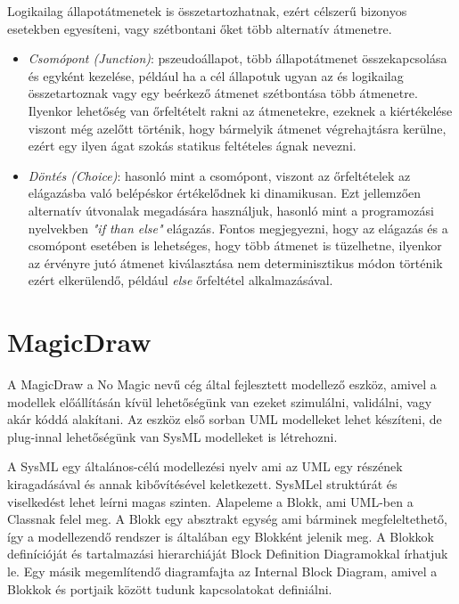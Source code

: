 \linebreak Logikailag állapotátmenetek is összetartozhatnak, ezért célszerű bizonyos esetekben egyesíteni, vagy szétbontani őket több alternatív átmenetre.
\begin{itemize}
	\item \emph{Csomópont (Junction)}: pszeudoállapot, több állapotátmenet összekapcsolása és egyként kezelése, például ha a cél állapotuk ugyan az és logikailag összetartoznak vagy egy beérkező átmenet szétbontása több átmenetre. Ilyenkor lehetőség van őrfeltételt rakni az átmenetekre, ezeknek a kiértékelése viszont még azelőtt történik, hogy bármelyik átmenet végrehajtásra kerülne, ezért egy ilyen ágat szokás statikus feltételes ágnak nevezni.
	\item \emph{Döntés (Choice)}: hasonló mint a csomópont, viszont az őrfeltételek az elágazásba való belépéskor értékelődnek ki dinamikusan. Ezt jellemzően alternatív útvonalak megadására használjuk, hasonló mint a programozási nyelvekben \emph{"if than else"} elágazás. Fontos megjegyezni, hogy az elágazás és a csomópont esetében is lehetséges, hogy több átmenet is tüzelhetne, ilyenkor az érvényre jutó átmenet kiválasztása nem determinisztikus módon történik ezért elkerülendő, például \emph{else} őrfeltétel alkalmazásával.
	
	
	
	
\end{itemize}

\section{MagicDraw}
A MagicDraw a No Magic \cite{NoMag} nevű cég által fejlesztett modellező eszköz, amivel a modellek előállításán kívül lehetőségünk van ezeket szimulálni, validálni, vagy akár kóddá alakítani. Az eszköz első sorban UML modelleket lehet készíteni, de plug-innal lehetőségünk van SysML \cite{SysML} modelleket is létrehozni.

A SysML egy általános-célú modellezési nyelv ami az UML egy részének kiragadásával és annak kibővítésével keletkezett. SysMLel struktúrát és viselkedést lehet leírni magas szinten. Alapeleme a Blokk, ami UML-ben a Classnak felel meg. A Blokk egy absztrakt egység ami bárminek megfeleltethető, így a modellezendő rendszer is általában egy Blokként jelenik meg. A Blokkok definícióját és tartalmazási hierarchiáját Block Definition Diagramokkal írhatjuk le. Egy másik megemlítendő diagramfajta az Internal Block Diagram, amivel a Blokkok és portjaik között tudunk kapcsolatokat definiálni.


